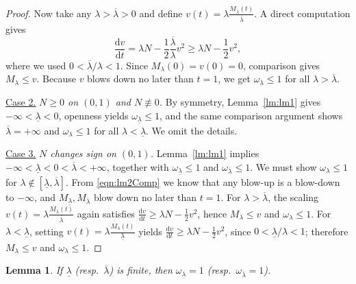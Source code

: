 \documentclass{amsart}
\newtheorem{lemma}[theorem]{Lemma}
\begin{document}
\begin{proof}
Now take any $\lambda > \overline{\lambda}>0$ and define $v(t) = \lambda\frac{M_{\overline{\lambda}}(t)}{\overline{\lambda}}$.
A direct computation gives
\[
\frac{\mathrm{d}v}{\mathrm{d}t} = \lambda N - \frac12 \frac{\overline{\lambda}}{\lambda} v^{2}
\ge \lambda N - \frac12 v^{2},
\]
where we used $0<\overline{\lambda}/\lambda<1$. Since $M_{\lambda}(0)=v(0)=0$, comparison gives $M_{\lambda}\le v$. Because $v$ blows down no later than $t=1$, we get $\omega_{\lambda}\le1$ for all $\lambda>\overline{\lambda}$.

\underline{Case 2.} \emph{$N \ge 0$ on $(0,1)$ and $N \not\equiv 0$.}
By symmetry, Lemma~\ref{lm:lm1} gives $-\infty<\underline{\lambda}<0$, openness yields $\omega_{\underline{\lambda}}\le1$, and the same comparison argument shows $\overline{\lambda}=+\infty$ and $\omega_{\lambda}\le1$ for all $\lambda<\underline{\lambda}$. We omit the details.

\underline{Case 3.} \emph{$N$ changes sign on $(0,1)$.}
Lemma~\ref{lm:lm1} implies $-\infty<\underline{\lambda}<0<\overline{\lambda}<+\infty$, together with $\omega_{\underline{\lambda}}\le1$ and $\omega_{\overline{\lambda}}\le1$.
We must show $\omega_{\lambda}\le1$ for $\lambda\notin[\underline{\lambda},\overline{\lambda}]$.
From \eqref{eqn:lm2Comp} we know that any blow-up is a blow-down to $-\infty$, and $M_{\underline{\lambda}},M_{\overline{\lambda}}$ blow down no later than $t=1$.
For $\lambda > \overline{\lambda}$, the scaling $v(t)=\lambda\frac{M_{\overline{\lambda}}(t)}{\overline{\lambda}}$ again satisfies $\frac{\mathrm{d}v}{\mathrm{d}t}\ge \lambda N - \frac12 v^{2}$, hence $M_{\lambda}\le v$ and $\omega_{\lambda}\le1$.
For $\lambda < \underline{\lambda}$, setting $v(t)=\lambda\frac{M_{\underline{\lambda}}(t)}{\underline{\lambda}}$ yields $\frac{\mathrm{d}v}{\mathrm{d}t}\ge \lambda N - \frac12 v^{2}$, since $0<\underline{\lambda}/\lambda<1$; therefore $M_{\lambda}\le v$ and $\omega_{\lambda}\le1$.
\end{proof}

\begin{lemma}\label{lm:exactblow}
If $\underline{\lambda}$ (resp.\ $\overline{\lambda}$) is finite, then $\omega_{\underline{\lambda}}=1$ (resp.\ $\omega_{\overline{\lambda}}=1$).
\end{lemma}
\end{document}
